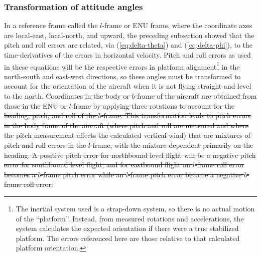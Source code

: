 \documentclass[12pt,twoside,english]{article}\usepackage[]{graphicx}\usepackage[]{color}
\let\OrgIndex\index
\renewcommand*{\index}[1]{\OrgIndex{#1}}
\providecommand{\DIFdel}[1]{{\protect\color{red}\sout{#1}}}                      %
\providecommand{\DIFdelbegin}{} %
\providecommand{\DIFdelend}{} %
\begin{document}
{{\subsubsection{Transformation of attitude angles\label{sub:angle-transforms-for-pitch-correction}}

In a reference frame called the $l$-frame or ENU frame, where the coordinate axes are local-east, local-north, and upward, the preceding subsection showed that the pitch and roll errors are related, via (\ref{eq:delta-theta}) and (\ref{eq:delta-phi}), to the time-derivatives of the errors in horizontal velocity. Pitch and roll errors as used in these equations will be the respective errors in platform alignment\footnote{The inertial system used is a strap-down system, so there is no actual motion of the ``platform''. Instead, from measured rotations and accelerations, the system calculates the expected orientation if there were a true stabilized platform. The errors referenced here are those relative to that calculated platform orientation.} in the north-south and east-west directions, so these angles must be transformed to account for the orientation of the aircraft when it is not flying straight-and-level to the north. 
\DIFdelbegin \DIFdel{Coordinates in the body or $b$-frame of the aircraft}%
\DIFdel{are obtained from those in the ENU or $l$-frame by applying three rotations}%
\DIFdel{to account for the heading, pitch, and roll of the $b$-frame. This transformation leads to pitch errors in the body frame of the aircraft (where pitch and roll are measured and where the pitch measurement affects the calculated vertical wind) that are mixtures of pitch and roll errors in the $l$-frame, with the mixture dependent primarily on the heading. A positive pitch error for northbound level flight will be a negative pitch error for southbound level flight, and for eastbound flight an $l$-frame roll error becomes a $b$-frame pitch error while an $l$-frame pitch error become a negative $b$-frame roll error. 
}\DIFdelend 

}}
\end{document}
